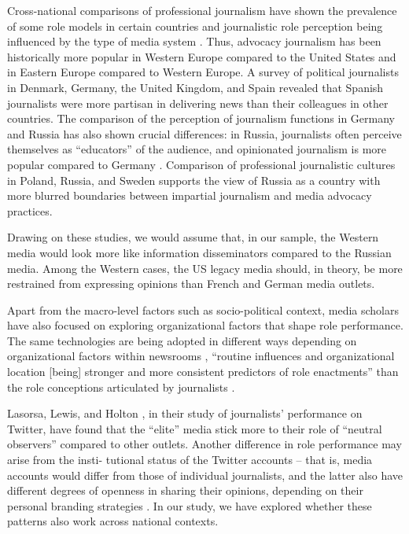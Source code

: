 Cross-national comparisons of professional journalism have shown the prevalence of some role models in certain countries \cite{Donsbach,HanitzschHanuschMellado,Waisbord} and journalistic role perception being influenced by the type of media system \cite{WillnatWeaverChoi}. Thus, advocacy journalism has been historically more popular in Western Europe compared to the United States \cite{Waisbord} and in Eastern Europe compared to Western Europe. A survey of political journalists in Denmark, Germany, the United Kingdom, and Spain \cite{VanDalenDeVreeseAlbaek} revealed that Spanish journalists were more partisan in delivering news than their colleagues in other countries. The comparison of the perception of journalism functions in Germany and Russia has also shown crucial differences: in Russia, journalists often perceive themselves as “educators” of the audience, and opinionated journalism is more popular compared to Germany \cite{Litvinenko}. Comparison of professional journalistic cultures in Poland, Russia, and Sweden \cite{NygrenDobekOstrowska} supports the view of Russia as a country with more blurred boundaries between impartial journalism and media advocacy practices.

Drawing on these studies, we would assume that, in our sample, the Western media would look more like information disseminators compared to the Russian media. Among the Western cases, the US legacy media should, in theory, be more restrained from expressing opinions than French and German media outlets.

Apart from the macro-level factors such as socio-political context, media scholars have also focused on exploring organizational factors that shape role performance. The same technologies are being adopted in different ways depending on organizational factors within newsrooms \cite{Boczkowski,Domingo,PaulussenUgille}, “routine influences and organizational location [being] stronger and more consistent predictors of role enactments” than the role conceptions articulated by journalists \cite[p.~550]{TandocHellmuellerVos}.

Lasorsa, Lewis, and Holton \cite{LasorsaLewisHolton}, in their study of journalists’ performance on Twitter, have found that the “elite” media stick more to their role of “neutral observers” compared to other outlets. Another difference in role performance may arise from the insti- tutional status of the Twitter accounts -- that is, media accounts would differ from those of individual journalists, and the latter also have different degrees of openness in sharing their opinions, depending on their personal branding strategies \cite{LasorsaLewisHolton}. In our study, we have explored whether these patterns also work across national contexts.

